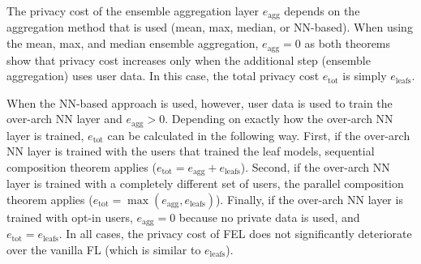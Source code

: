 \documentclass{article}
\begin{document}
The privacy cost of the ensemble aggregation layer $e_\mathrm{agg}$ depends on the aggregation method that is used (mean, max, median, or NN-based).
When using the mean, max, and median ensemble aggregation, $e_\mathrm{agg}=0$ as both theorems show that privacy cost increases only when the additional step (ensemble aggregation) uses user data.
%
In this case, the total privacy cost $e_\mathrm{tot}$ is simply $e_\mathrm{leafs}$.


%
When the NN-based approach is used, however, user data is used to train the over-arch NN layer and $e_\mathrm{agg} > 0$. Depending on exactly how the over-arch NN layer is trained, $e_\mathrm{tot}$ can be calculated in the following way.
%
First, if the over-arch NN layer is trained with the users that trained the leaf models, sequential composition theorem applies ($e_\mathrm{tot} = e_\mathrm{agg} + e_\mathrm{leafs}$).
Second, if the over-arch NN layer is trained with a completely different set of users, the parallel composition theorem applies ($e_\mathrm{tot} = \max(e_\mathrm{agg}, e_\mathrm{leafs})$).
Finally, if the over-arch NN layer is trained with opt-in users, $e_\mathrm{agg}=0$ because no private data is used, and $e_\mathrm{tot}=e_\mathrm{leafs}$.
In all cases, the privacy cost of FEL does not significantly deteriorate over the vanilla FL (which is similar to $e_\mathrm{leafs}$).


\end{document}

